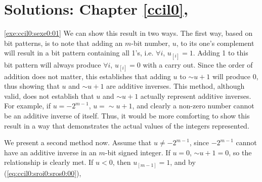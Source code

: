 \chapter[Solutions: Chapter \ref{ccil0}]
        {Solutions: Chapter \ref{ccil0}, \ccilzerolongtitle{}}

\label{ccis0}

\vworkexercisechapterheader{}
\begin{vworkexercisesolution}{\ref{exe:ccil0:sexe0:01}}
We can show this result in two ways.  The first way, based on bit patterns, is to note
that adding an $m$-bit number, $u$, to its one's complement will result in a bit pattern
containing all 1's, i.e. $\forall i$, $u_{[i]} = 1$.  Adding 1 to this bit pattern will
always produce $\forall i$, $u_{[i]} = 0$ with a carry out.  Since the order of addition
does not matter, this establishes that adding $u$ to $\sim{}u+1$ will produce 0, thus showing
that $u$ and $\sim{}u+1$ are additive inverses.  This method, although valid, does not 
establish that $u$ and $\sim{}u+1$ actually represent additive inverses.  For example, if
$u=-2^{m-1}$, $u=\sim{}u+1$, and clearly a non-zero number cannot be an additive inverse of
itself.  Thus, it would be more comforting to show this result in a way that demonstrates the
actual values of the integers represented.

We present a second method now.  Assume that $u \neq -2^{m-1}$, since 
$-2^{m-1}$ cannot have an additive inverse in an $m$-bit signed integer.
If $u=0$, $\sim{}u+1=0$, so the relationship is clearly met.  If $u<0$, then
$u_{[m-1]}=1$, and by
(\ref{eq:ccil0:sroi0:sros0:00}),


\end{vworkexercisesolution}
\vworkexercisechapterfooter


